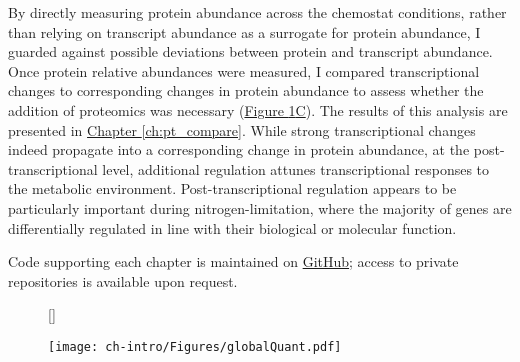 By directly measuring protein abundance across the chemostat conditions, rather than relying on transcript abundance as a surrogate for protein abundance, I guarded against possible deviations between protein and transcript abundance. Once protein relative abundances were measured, I compared transcriptional changes to corresponding changes in protein abundance to assess whether the addition of proteomics was necessary (\hyperref[introFig:primarytopics]{Figure \ref{introFig:primarytopics}C}). The results of this analysis are presented in \hyperref[ch:pt_compare]{Chapter \ref{ch:pt_compare}}.  While strong transcriptional changes  indeed propagate into a corresponding change in protein abundance, at the post-transcriptional level, additional regulation attunes transcriptional responses to the metabolic environment. Post-transcriptional regulation appears to be particularly important during nitrogen-limitation, where the majority of genes are differentially regulated in line with their biological or molecular function.

Code supporting each chapter is maintained on \href{https://github.com/shackett}{GitHub}; access to private repositories is available upon request.

\begin{figure}[h!]
[\FBwidth]
{\caption[Summary of primary thesis topics]{}\label{introFig:primarytopics}}
{\texttt{[image: ch-intro/Figures/globalQuant.pdf]}}
\end{figure}

